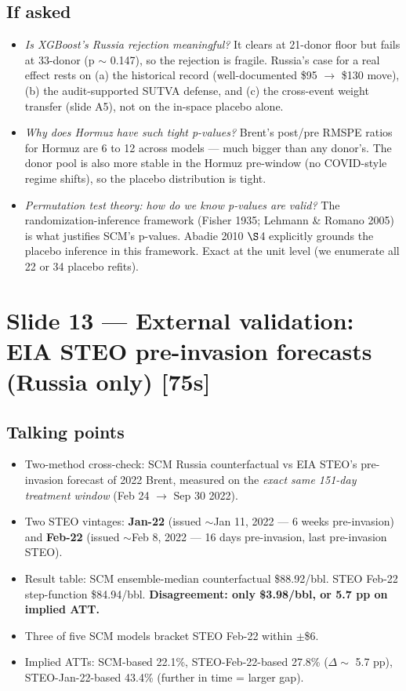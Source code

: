 \documentclass[11pt,a4paper]{article}
\newcommand{\timetag}[1]{\hfill\textcolor{muted}{\small[#1]}}
\newcommand{\highlight}[1]{\textcolor{accent}{\textbf{#1}}}
\begin{document}
\subsection{If asked}
\begin{itemize}
  \item \textit{Is XGBoost's Russia rejection meaningful?} It clears at 21-donor floor but fails at 33-donor (p $\sim$ 0.147), so the rejection is fragile. Russia's case for a real effect rests on (a) the historical record (well-documented \$95 $\to$ \$130 move), (b) the audit-supported SUTVA defense, and (c) the cross-event weight transfer (slide A5), not on the in-space placebo alone.
  \item \textit{Why does Hormuz have such tight p-values?} Brent's post/pre RMSPE ratios for Hormuz are 6 to 12 across models --- much bigger than any donor's. The donor pool is also more stable in the Hormuz pre-window (no COVID-style regime shifts), so the placebo distribution is tight.
  \item \textit{Permutation test theory: how do we know p-values are valid?} The randomization-inference framework (Fisher 1935; Lehmann \& Romano 2005) is what justifies SCM's p-values. Abadie 2010 $\S$4 explicitly grounds the placebo inference in this framework. Exact at the unit level (we enumerate all 22 or 34 placebo refits).
\end{itemize}

\section{Slide 13 --- External validation: EIA STEO pre-invasion forecasts (Russia only) \timetag{75s}}

\subsection{Talking points}
\begin{itemize}
  \item Two-method cross-check: SCM Russia counterfactual vs EIA STEO's pre-invasion forecast of 2022 Brent, measured on the \emph{exact same 151-day treatment window} (Feb 24 $\to$ Sep 30 2022).
  \item Two STEO vintages: \highlight{Jan-22} (issued $\sim$Jan 11, 2022 --- 6 weeks pre-invasion) and \highlight{Feb-22} (issued $\sim$Feb 8, 2022 --- 16 days pre-invasion, last pre-invasion STEO).
  \item Result table: SCM ensemble-median counterfactual \$88.92/bbl. STEO Feb-22 step-function \$84.94/bbl. \highlight{Disagreement: only \$3.98/bbl, or 5.7 pp on implied ATT.}
  \item Three of five SCM models bracket STEO Feb-22 within $\pm$\$6.
  \item Implied ATTs: SCM-based 22.1\%, STEO-Feb-22-based 27.8\% ($\Delta \sim$ 5.7 pp), STEO-Jan-22-based 43.4\% (further in time = larger gap).
\end{itemize}
\end{document}

